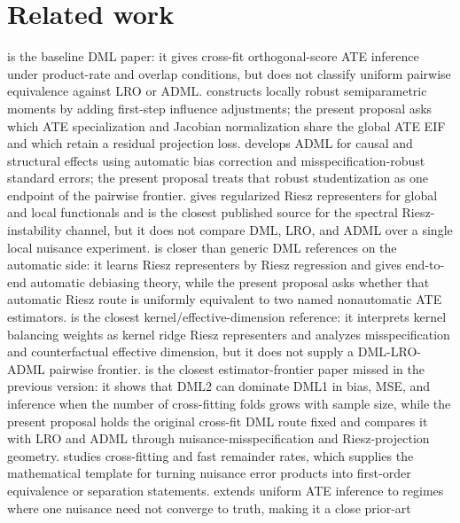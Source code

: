 \documentclass[11pt]{article}
\theoremstyle{definition}
\theoremstyle{plain}
\theoremstyle{remark}
\begin{document}
\section{Related work}
\citet{ChernozhukovEtAl2018DML} is the baseline DML paper: it gives cross-fit
orthogonal-score ATE inference under product-rate and overlap conditions, but
does not classify uniform pairwise equivalence against LRO or ADML.
\citet{ChernozhukovEscancianoIchimuraNeweyRobins2022LRO} constructs locally
robust semiparametric moments by adding first-step influence adjustments; the
present proposal asks which ATE specialization and Jacobian normalization share
the global ATE EIF and which retain a residual projection loss.
\citet{ChernozhukovNeweySingh2022ADML} develops ADML for causal and structural
effects using automatic bias correction and misspecification-robust standard
errors; the present proposal treats that robust studentization as one endpoint
of the pairwise frontier.
\citet{ChernozhukovNeweySingh2022RR} gives regularized Riesz representers for
global and local functionals and is the closest published source for the
spectral Riesz-instability channel, but it does not compare DML, LRO, and ADML
over a single local nuisance experiment.
\citet{ChernozhukovNeweyQuintasMartinezSyrgkanis2024RieszRegression} is closer
than generic DML references on the automatic side: it learns Riesz
representers by Riesz regression and gives end-to-end automatic debiasing
theory, while the present proposal asks whether that automatic Riesz route is
uniformly equivalent to two named nonautomatic ATE estimators.
\citet{Singh2024KRRR} is the closest kernel/effective-dimension reference: it
interprets kernel balancing weights as kernel ridge Riesz representers and
analyzes misspecification and counterfactual effective dimension, but it does
not supply a DML-LRO-ADML pairwise frontier.
\citet{Velez2024DML} is the closest estimator-frontier paper missed in the
previous version: it shows that DML2 can dominate DML1 in bias, MSE, and
inference when the number of cross-fitting folds grows with sample size, while
the present proposal holds the original cross-fit DML route fixed and compares
it with LRO and ADML through nuisance-misspecification and Riesz-projection
geometry.
\citet{NeweyRobins2018CrossFit} studies cross-fitting and fast remainder rates,
which supplies the mathematical template for turning nuisance error products
into first-order equivalence or separation statements.
\citet{AvagyanVansteelandt2022PBR} extends uniform ATE inference to regimes
where one nuisance need not converge to truth, making it a close prior-art
\end{document}
